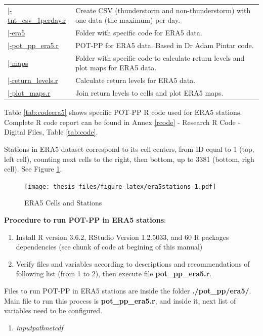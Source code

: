 \documentclass[12pt,oneside]{reedthesis}
\providecommand{\tightlist}{%
  \setlength{\itemsep}{0pt}\setlength{\parskip}{0pt}}
\begin{document}
\begin{longtable}[t]{>{\raggedright\arraybackslash}p{1.3in}>{\raggedright\arraybackslash}p{4.9in}}
\href{ftp://ftp.geocorp.co/windthesis/code/pot_pp/write_t_nt_csv_one_data_per_day.r}{\;\;\;\;|-tnt\_csv\_1perday.r} & Create CSV (thunderstorm and non-thunderstorm) with one data (the maximum) per day.\\
\href{ftp://ftp.geocorp.co/windthesis/code/pot_pp/era5/}{\;\;\;\;|-era5} & Folder with specific code for ERA5 data.\\
\href{ftp://ftp.geocorp.co/windthesis/code/pot_pp/era5/pot_pp_era5.r}{\;\;\;\;\;\;|-pot\_pp\_era5.r} & POT-PP for ERA5 data. Based in Dr Adam Pintar code.\\
\href{ftp://ftp.geocorp.co/windthesis/code/pot_pp/era5/maps/}{\;\;\;\;\;\;|-maps} & Folder with specific code to calculate return levels and plot maps for ERA5 data.\\
\href{ftp://ftp.geocorp.co/windthesis/code/pot_pp/era5/maps/return_levels.r}{\;\;\;\;\;\;\;\;|-return\_levels.r} & Calculate return levels for ERA5 data.\\
\href{ftp://ftp.geocorp.co/windthesis/code/pot_pp/era5/maps/plot_maps.r}{\;\;\;\;\;\;\;\;|-plot\_maps.r} & Join return levels to cells and plot ERA5 maps.\\
\bottomrule
\end{longtable}
\endgroup{}

Table \ref{tab:codeera5} shows specific POT-PP R code used for ERA5 stations. Complete R code report can be found in Annex \ref{rcode} - Research R Code - Digital Files, Table \ref{tab:code}.

Stations in ERA5 dataset correspond to its cell centers, from ID equal to 1 (top, left cell), counting next cells to the right, then bottom, up to 3381 (bottom, righ cell). See Figure \ref{fig:era5stations}.
\begin{figure}
\centering
\texttt{[image: thesis\_files/figure-latex/era5stations-1.pdf]}
\caption{\label{fig:era5stations}ERA5 Cells and Stations}
\end{figure}
\textbf{Procedure to run POT-PP in ERA5 stations}:
\begin{enumerate}
\def\labelenumi{\arabic{enumi}.}
\item
  Install R version 3.6.2, RStudio Version 1.2.5033, and 60 R packages dependencies (see chunk of code at begining of this manual)
\item
  Verify files and variables according to descriptions and recommendations of following list (from 1 to 2), then execute file \textbf{pot\_pp\_era5.r}.
\end{enumerate}
Files to run POT-PP in ERA5 stations are inside the folder \textbf{./pot\_pp/era5/}. Main file to run this process is \textbf{pot\_pp\_era5.r}, and inside it, next list of variables need to be configured.
\begin{enumerate}
\def\labelenumi{\arabic{enumi}.}
\tightlist
\item
  \emph{inputpathnetcdf}
\end{enumerate}
\scriptsize
\end{document}
